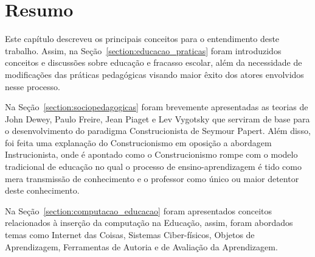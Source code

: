 \section{Resumo}

Este capítulo descreveu os principais conceitos para o entendimento deste trabalho. Assim, na Seção~\ref{section:educacao_praticas} foram introduzidos conceitos e discussões sobre educação e fracasso escolar, além da necessidade de modificações das práticas pedagógicas visando maior êxito dos atores envolvidos nesse processo. %

Na Seção~\ref{section:sociopedagogicas} foram brevemente apresentadas as teorias de John Dewey, Paulo Freire, Jean Piaget e Lev Vygotsky que serviram de base para o desenvolvimento do paradigma Construcionista de Seymour Papert. Além disso, foi feita uma explanação do Construcionismo em oposição a abordagem Instrucionista, onde é apontado como o Construcionismo rompe com o modelo tradicional de educação no qual o processo de ensino-aprendizagem é tido como mera transmissão de conhecimento e o professor como único ou maior detentor deste conhecimento.

Na Seção~\ref{section:computacao_educacao} foram apresentados conceitos relacionados à inserção da computação na Educação, assim, foram abordados temas como %
Internet das Coisas, Sistemas Ciber-físicos, Objetos de Aprendizagem, 
Ferramentas de Autoria e de Avaliação da Aprendizagem. 
